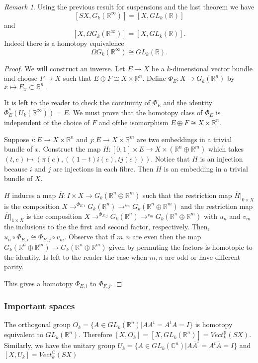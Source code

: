 \documentclass[a4paper,10pt]{article}
\theoremstyle{plain}%
\theoremstyle{definition}
\theoremstyle{remark}
\newtheorem{rem}{Remark}
\newcommand{\RR}{\mathbb{R}}
\newcommand{\CC}{\mathbb{C}}
\begin{document}
\begin{rem}
Using the previous result for suspensions and the last theorem we have
\[
[SX, G_k(\RR^\infty)] = [X, GL_k(\RR)]
\]
and
\[
[X, \Omega G_k(\RR^\infty)] = [X, GL_k(\RR)].
\]
Indeed there is a homotopy equivalence
\[
\Omega G_k(\RR^\infty) \cong GL_k(\RR).
\]
\end{rem}

\begin{proof}
We will construct an inverse. Let $E\to X$ be a $k$-dimensional vector bundle and choose $F \to X$ such that $E\oplus F \cong X\times \RR^n.$
Define $\Phi_E: X\to G_k(\RR^ n)$ by $x\mapsto E_x\subset \RR^n.$

It is left to the reader to check the continuity of $\Phi_E$ and the identity $\Phi_E^*(U_k(\RR^\infty))= E.$ We must prove that the homotopy class of $\Phi_E$ is independent of the choice of $F$ and ofthe isomorphism $E\oplus F \cong X\times \RR^n.$

Suppose $i:E\to X\times\RR^n$ and $j:E\to X\times\RR^m$ are two embeddings in a trivial bundle of $x$. Construct the map
$H:[0,1]\times E\to X\times(\RR^n\oplus\RR^m)$ which takes $(t,e)\mapsto (\pi(e),((1-t)i(e),tj(e))).$ Notice that $H$ is an injection because $i$ and $j$ are injections in each fibre. Then $H$ is an embedding in a trivial bundle of $X$.

$H$ induces a map $\overline{H}: I\times X \to G_k(\RR^n\oplus\RR^m)$ such that
the restriction map $\overline{H}|_{{0}\times X}$ is the composition $X \to^{\Phi_{E,i}} G_k(\RR^n) \to^{u_n}  G_k(\RR^n\oplus\RR^m)$ and the restriction map $\overline{H}|_{{1}\times X}$ is the composition $X \to^{\Phi_{E,j}} G_k(\RR^n) \to^{v_m}  G_k(\RR^n\oplus\RR^m)$ with $u_n$ and $v_m$ the inclusions to the the first and second factor, respectively. Then, $u_n\circ \Phi_{E,i} \cong \Phi_{E,j} \circ v_m.$ Observe that if $m,n$ are even then the map $G_k(\RR^n\oplus\RR^m) \to G_k(\RR^n\oplus\RR^m)$ given by permuting the factors is homotopic to the identity. Is left to the reader the case when $m,n$ are odd or have different parity.

This gives a homotopy $\Phi_{E,i}$ to $\Phi_{F,j}.$
\end{proof}

\subsubsection{Important spaces}

The orthogonal group $O_k = \{ A\in GL_k(\RR^n) | AA^t = A^tA = I\}$ is homotopy equivalent to $GL_k(\RR^n).$ Therefore $[X,O_k]=[X,GL_k(\RR^n)] = Vect_k^\RR(SX).$ Similarly, we have the unitary group $U_k = \{ A\in GL_k(\CC^n) | A\overline{A}^t = A^t\overline{A} = I\}$ and $[X,U_k]= Vect_k^\CC(SX)$
\end{document}
